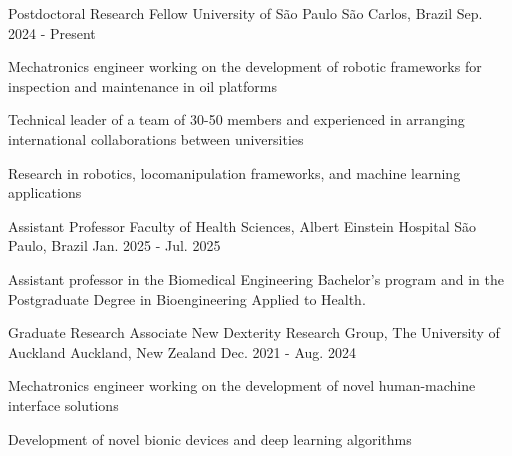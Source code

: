 \begin{cventries}

    
  \cventry
    {Postdoctoral Research Fellow} %
    {University of São Paulo} %
    {São Carlos, Brazil} %
    {Sep. 2024 - Present} %
    {
      \begin{cvitems} %
        \item {Mechatronics engineer working on the development of robotic frameworks for inspection and maintenance in oil platforms}
        \item {Technical leader of a team of 30-50 members and experienced in arranging international collaborations between universities}
        \item {Research in robotics, locomanipulation frameworks, and machine learning applications}
      \end{cvitems}
    }

  \cventry
    {Assistant Professor} %
    {Faculty of Health Sciences, Albert Einstein Hospital} %
    {São Paulo, Brazil} %
    {Jan. 2025 - Jul. 2025} %
    {
      \begin{cvitems} %
        \item {Assistant professor in the Biomedical Engineering Bachelor's program and in the Postgraduate Degree in Bioengineering Applied to Health.}
      \end{cvitems}
    }

  \cventry
    {Graduate Research Associate} %
    {New Dexterity Research Group, The University of Auckland} %
    {Auckland, New Zealand} %
    {Dec. 2021 - Aug. 2024} %
    {
      \begin{cvitems} %
        \item {Mechatronics engineer working on the development of novel human-machine interface solutions}
        \item {Development of novel bionic devices and deep learning algorithms}
      \end{cvitems}
    }
\vspace{-5pt} 


\end{cventries}
